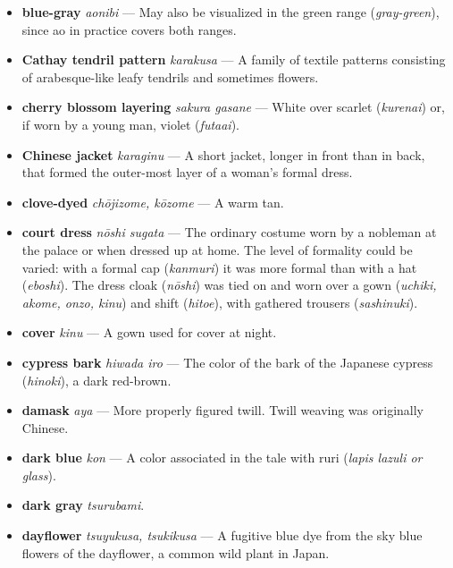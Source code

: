 \documentclass{article}
\begin{document}
\begin{multicols}{3}
\begin{footnotesize}
\begin{itemize}[
			label=,
			leftmargin=0em,
			rightmargin=-1.5em,
			itemindent=-2em,
			nosep,
		]
		\item \textbf{blue-gray} \textit{aonibi} --- May also be visualized in the green range (\textit{gray-green}), since ao in practice covers both ranges.

		\item \textbf{Cathay tendril pattern} \textit{karakusa} --- A family of textile patterns consisting of arabesque-like leafy tendrils and sometimes flowers.

		\item \textbf{cherry blossom layering} \textit{sakura gasane} --- White over scarlet (\textit{kurenai}) or, if worn by a young man, violet (\textit{futaai}).

		\item \textbf{Chinese jacket} \textit{karaginu} --- A short jacket, longer in front than in back, that formed the outer-most layer of a woman's formal dress.

		\item \textbf{clove-dyed} \textit{chōjizome, kōzome} --- A warm tan.

		\item \textbf{court dress} \textit{nōshi sugata} --- The ordinary costume worn by a nobleman at the palace or when dressed up at home. The level of formality could be varied: with a formal cap (\textit{kanmuri}) it was more formal than with a hat (\textit{eboshi}). The dress cloak (\textit{nōshi}) was tied on and worn over a gown (\textit{uchiki, akome, onzo, kinu}) and shift (\textit{hitoe}), with gathered trousers (\textit{sashinuki}).

		\item \textbf{cover} \textit{kinu} --- A gown used for cover at night.

		\item \textbf{cypress bark} \textit{hiwada iro} --- The color of the bark of the Japanese cypress (\textit{hinoki}), a dark red-brown.

		\item \textbf{damask} \textit{aya} --- More properly figured twill. Twill weaving was originally Chinese.

		\item \textbf{dark blue} \textit{kon} --- A color associated in the tale with ruri (\textit{lapis lazuli or glass}).

		\item \textbf{dark gray} \textit{tsurubami}.

		\item \textbf{dayflower} \textit{tsuyukusa, tsukikusa} --- A fugitive blue dye from the sky blue flowers of the dayflower, a common wild plant in Japan.


\end{itemize}
\end{footnotesize}
\end{multicols}
\end{document}
